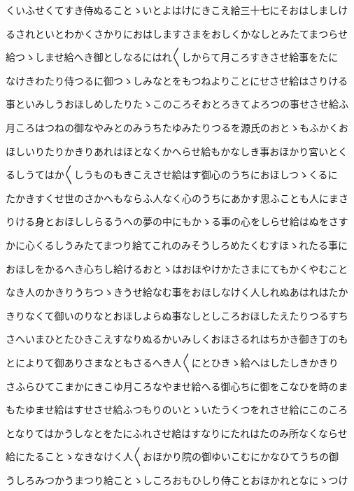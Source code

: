 \documentclass[a4paper,11pt,landscape]{ltjtarticle}
\begin{document}
\par\medskip
くいふせくてすき侍ぬることゝいとよはけにきこえ給三十七にそおはしましけ
\par\medskip
るされといとわかくさかりにおはしますさまをおしくかなしとみたてまつらせ
\par\medskip
給つゝしませ給へき御としなるにはれ〱しからて月ころすきさせ給事をたに
\par\medskip
なけきわたり侍つるに御つゝしみなとをもつねよりことにせさせ給はさりける
\par\medskip
事といみしうおほしめしたりたゝこのころそおとろきてよろつの事せさせ給ふ
\par\medskip
月ころはつねの御なやみとのみうちたゆみたりつるを源氏のおとゝもふかくお
\par\medskip
ほしいりたりかきりあれはほとなくかへらせ給もかなしき事おほかり宮いとく
\par\medskip
るしうてはか〱しうものもきこえさせ給はす御心のうちにおほしつゝくるに
\par\medskip
たかきすくせ世のさかへもならふ人なく心のうちにあかす思ふことも人にまさ
\par\medskip
りける身とおほししらるうへの夢の中にもかゝる事の心をしらせ給はぬをさす
\par\medskip
かに心くるしうみたてまつり給てこれのみそうしろめたくむすほゝれたる事に
\par\medskip
おほしをかるへき心ちし給けるおとゝはおほやけかたさまにてもかくやむこと
\par\medskip
なき人のかきりうちつゝきうせ給なむ事をおほしなけく人しれぬあはれはたか
\par\medskip
きりなくて御いのりなとおほしよらぬ事なしとしころおほしたえたりつるすち
\par\medskip
さへいまひとたひきこえすなりぬるかいみしくおほさるれはちかき御き丁のも
\par\medskip
とによりて御ありさまなともさるへき人〱にとひきゝ給へはしたしきかきり
\par\medskip
さふらひてこまかにきこゆ月ころなやませ給へる御心ちに御をこなひを時のま
\par\medskip
もたゆませ給はすせさせ給ふつもりのいとゝいたうくつをれさせ給にこのころ
\par\medskip
となりてはかうしなとをたにふれさせ給はすなりにたれはたのみ所なくならせ
\par\medskip
給にたることゝなきなけく人〱おほかり院の御ゆいこむにかなひてうちの御
\par\medskip
うしろみつかうまつり給ことゝしころおもひしり侍ことおほかれとなにゝつけ
\par\medskip
\end{document}
